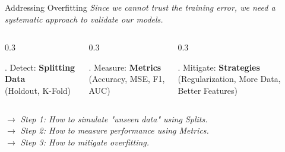 \begin{frame}{Addressing Overfitting}
    \centering
    \large \textit{Since we cannot trust the training error, we need a systematic approach to validate our models.}
    
    \vspace{0.8cm}
    
    \begin{columns}[T]
        \begin{column}{0.3\textwidth}
            \begin{block}{. Detect:}
                \centering
                \textbf{Splitting Data}\\
                (Holdout, K-Fold)
            \end{block}
        \end{column}
        \begin{column}{0.3\textwidth}
            \begin{block}{. Measure:}
                \centering
                \textbf{Metrics}\\
                (Accuracy, MSE, F1, AUC)
            \end{block}
        \end{column}
        \begin{column}{0.3\textwidth}
            \begin{block}{. Mitigate:}
                \centering
                \textbf{Strategies}\\
                (Regularization, More Data, Better Features)
            \end{block}
        \end{column}
    \end{columns}
    
    \vspace{0.5cm}
    \centering
    \small $\rightarrow$ \textit{Step 1: How to simulate "unseen data" using Splits.} \\
    \small $\rightarrow$ \textit{Step 2: How to measure performance using Metrics.} \\
    \small $\rightarrow$ \textit{Step 3: How to mitigate overfitting.}
\end{frame}



